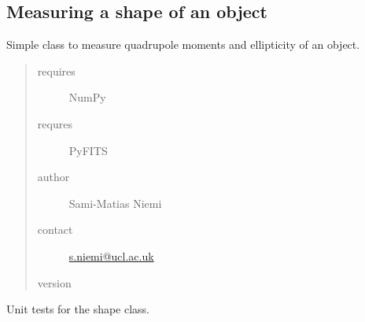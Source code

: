 \documentclass[a4paper,11pt,english]{sphinxmanual}
\begin{document}
\label{analysis:module-analysis.shape}

\subsection{Measuring a shape of an object}
\label{analysis:measuring-a-shape-of-an-object}
Simple class to measure quadrupole moments and ellipticity of an object.
\begin{quote}\begin{description}
\item[{requires}] \leavevmode
NumPy

\item[{requres}] \leavevmode
PyFITS

\item[{author}] \leavevmode
Sami-Matias Niemi

\item[{contact}] \leavevmode
\href{mailto:s.niemi@ucl.ac.uk}{s.niemi@ucl.ac.uk}

\item[{version}] 

\end{description}\end{quote}

\begin{fulllineitems}
\label{analysis:analysis.shape.TestShape}
Unit tests for the shape class.

\end{fulllineitems}

\end{document}

